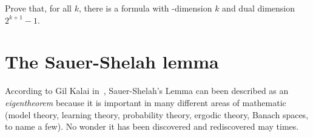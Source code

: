 \documentclass[scombinatorics.tex]{subfiles}
\begin{document}
\begin{exercise}
  Prove that, for all $k$, there is a formula with \vc-dimension $k$ and dual dimension $2^{k+1}-1$.
  
  




  







  
  \QED
\end{exercise}

\section{The Sauer-Shelah lemma}\label{sauer}

\def\ceq#1#2#3{\parbox[t]{15ex}{$\displaystyle #1$}\medrel{#2}{$\displaystyle #3$}}


According to Gil Kalai in~\cite{kalai}, Sauer-Shelah's Lemma can been described as an \textit{eigentheorem\/} because it is important in many different areas of mathematic (model theory, learning theory, probability theory, ergodic theory, Banach spaces, to name a few).
No wonder it has been discovered and rediscovered may times.
\end{document}
